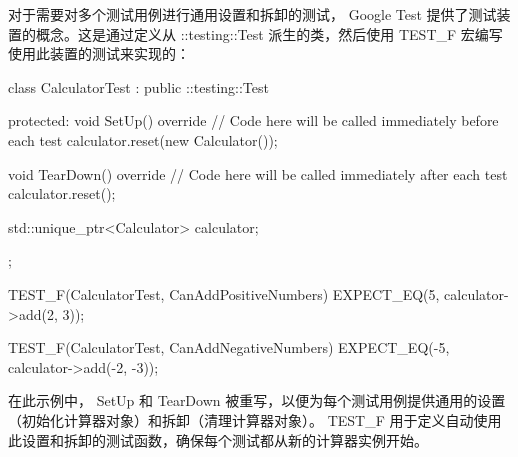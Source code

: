 对于需要对多个测试用例进行通用设置和拆卸的测试， Google Test 提供了测试装置的概念。这是通过定义从 ::testing::Test 派生的类，然后使用 TEST\_F 宏编写使用此装置的测试来实现的：

\begin{cpp}
class CalculatorTest : public ::testing::Test {
    protected:
    void SetUp() override {
        // Code here will be called immediately before each test
        calculator.reset(new Calculator());
    }

    void TearDown() override {
        // Code here will be called immediately after each test
        calculator.reset();
    }

    std::unique_ptr<Calculator> calculator;
};

TEST_F(CalculatorTest, CanAddPositiveNumbers) {
    EXPECT_EQ(5, calculator->add(2, 3));
}

TEST_F(CalculatorTest, CanAddNegativeNumbers) {
    EXPECT_EQ(-5, calculator->add(-2, -3));
}
\end{cpp}

在此示例中， SetUp 和 TearDown 被重写，以便为每个测试用例提供通用的设置（初始化计算器对象）和拆卸（清理计算器对象）。 TEST\_F 用于定义自动使用此设置和拆卸的测试函数，确保每个测试都从新的计算器实例开始。
























